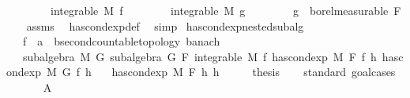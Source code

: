 \begin{isabellebody}
\ \ \ \ \ \ \ \ {\isachardoublequoteopen}integrable\ M\ f{\isachardoublequoteclose}\isanewline
\ \ \ \ \ \ \ \ {\isachardoublequoteopen}integrable\ M\ g{\isachardoublequoteclose}\isanewline
\ \ \ \ \ \ \ \ {\isachardoublequoteopen}g\ {\isasymin}\ borel{\isacharunderscore}{\kern0pt}measurable\ F{\isachardoublequoteclose}\isanewline
%
\isadelimproof
\ \ %
\endisadelimproof
%
\isatagproof
{}\isamarkupfalse%
\ assms\ \isamarkupfalse%
\ has{\isacharunderscore}{\kern0pt}cond{\isacharunderscore}{\kern0pt}exp{\isacharunderscore}{\kern0pt}def\ \isamarkupfalse%
\ simp{\isacharplus}{\kern0pt}%
\endisatagproof
{\isafoldproof}%
%
\isadelimproof
\isanewline
%
\endisadelimproof
\isanewline
\isanewline
\isanewline
{}\isamarkupfalse%
\ has{\isacharunderscore}{\kern0pt}cond{\isacharunderscore}{\kern0pt}exp{\isacharunderscore}{\kern0pt}nested{\isacharunderscore}{\kern0pt}subalg{\isacharcolon}{\kern0pt}\isanewline
\ \ \ f\ {\isacharcolon}{\kern0pt}{\isacharcolon}{\kern0pt}\ {\isachardoublequoteopen}{\isacharprime}{\kern0pt}a\ {\isasymRightarrow}\ {\isacharprime}{\kern0pt}b{\isacharcolon}{\kern0pt}{\isacharcolon}{\kern0pt}{\isacharbraceleft}{\kern0pt}second{\isacharunderscore}{\kern0pt}countable{\isacharunderscore}{\kern0pt}topology{\isacharcomma}{\kern0pt}\ banach{\isacharbraceright}{\kern0pt}{\isachardoublequoteclose}\isanewline
\ \ \ {\isachardoublequoteopen}subalgebra\ M\ G{\isachardoublequoteclose}\ {\isachardoublequoteopen}subalgebra\ G\ F{\isachardoublequoteclose}\ {\isachardoublequoteopen}integrable\ M\ f{\isachardoublequoteclose}\ {\isachardoublequoteopen}has{\isacharunderscore}{\kern0pt}cond{\isacharunderscore}{\kern0pt}exp\ M\ F\ f\ h{\isachardoublequoteclose}\ {\isachardoublequoteopen}has{\isacharunderscore}{\kern0pt}cond{\isacharunderscore}{\kern0pt}exp\ M\ G\ f\ h{\isacharprime}{\kern0pt}{\isachardoublequoteclose}\isanewline
\ \ \ {\isachardoublequoteopen}has{\isacharunderscore}{\kern0pt}cond{\isacharunderscore}{\kern0pt}exp\ M\ F\ h{\isacharprime}{\kern0pt}\ h{\isachardoublequoteclose}\isanewline
%
\isadelimproof
%
\endisadelimproof
%
\isatagproof
{}\isamarkupfalse%
\ {\isacharminus}{\kern0pt}\isanewline
\ \ \isamarkupfalse%
\ {\isacharquery}{\kern0pt}thesis\isanewline
\ \ \isamarkupfalse%
\ {\isacharparenleft}{\kern0pt}standard{\isacharcomma}{\kern0pt}\ goal{\isacharunderscore}{\kern0pt}cases{\isacharparenright}{\kern0pt}\isanewline
\ \ \ \ \isamarkupfalse%
\ {\isacharparenleft}{\kern0pt}{}\ A{\isacharparenright}{\kern0pt}\isanewline

\end{isabellebody}
